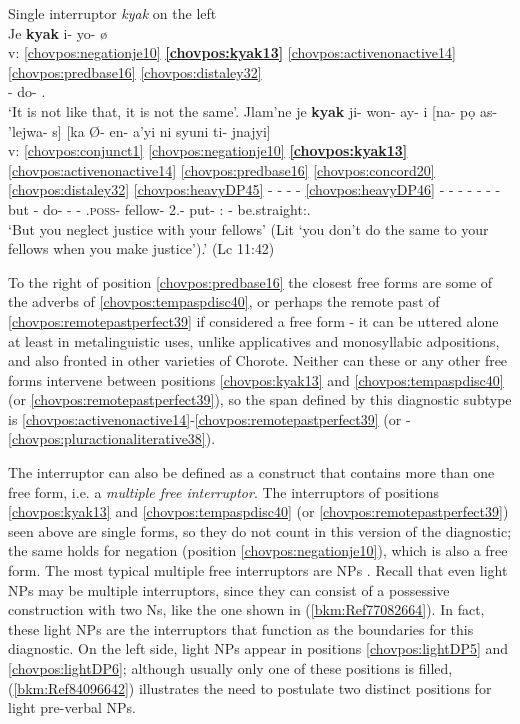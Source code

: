\documentclass[output=paper]{langscibook}
\begin{document}
\ea\label{ex:chor:key:3}Single interruptor \textit{kyak} on the left\\ 
    \ea
    \glll {} Je \textbf{kyak} i- yo- ø\\
    v: \ref{chovpos:negationje10} \textbf{\ref{chovpos:kyak13}} \ref{chovpos:activenonactive14} \ref{chovpos:predbase16} \ref{chovpos:distaley32} \\ 
    {} \Neg{} \Dem{} \Third{}- do- \Ap.\Dist{}\\
    \glt `It is not like that, it is not the same'.
    \ex 
    \glll {} Jlam'ne je \textbf{kyak} ji- won- ay- i [na- pọ as- 'lejwa- s] [ka Ø- en- a'yi ni syuni ti- jnajyi]\\ 
    v: \ref{chovpos:conjunct1} \ref{chovpos:negationje10} \textbf{\ref{chovpos:kyak13}} \ref{chovpos:activenonactive14} \ref{chovpos:predbase16} \ref{chovpos:concord20} \ref{chovpos:distaley32} \ref{chovpos:heavyDP45} - - - - \ref{chovpos:heavyDP46} - - - - - - - \\
     {} but \Neg{} \Dem{} \Second{}- do- \Second\Pl{}- \Ap{} \Dem{}{}- \Pl{} \Second\Pl{}.\textsc{poss}{}- fellow- \Pl{} \Comp{} 2.\Irr{}- put- \Second\Pl{}:\Ap{} \Dem{} \Dem{} \Third{}- be.straight:\Ap.\Loc{}\\
    \glt `But you neglect justice with your fellows' (Lit `you don't do the same to your fellows when you make justice').' (Lc 11:42)
    \z 
\z 

To the right of position \ref{chovpos:predbase16} the closest free forms are some of the adverbs of \ref{chovpos:tempaspdisc40}, or perhaps the remote past of \ref{chovpos:remotepastperfect39} if considered a free form - it can be uttered alone at least in metalinguistic uses, unlike applicatives and monosyllabic adpositions, and also fronted in other varieties of Chorote. Neither can these or any other free forms intervene between positions \ref{chovpos:kyak13} and \ref{chovpos:tempaspdisc40} (or \ref{chovpos:remotepastperfect39}), so the span defined by this diagnostic subtype is \ref{chovpos:activenonactive14}{}-\ref{chovpos:remotepastperfect39} (or -\ref{chovpos:pluractionaliterative38}).

The interruptor can also be defined as a construct that contains more than one free form, i.e. a \textit{multiple free interruptor}. The interruptors of positions \ref{chovpos:kyak13} and \ref{chovpos:tempaspdisc40} (or \ref{chovpos:remotepastperfect39}) seen above are single forms, so they do not count in this version of the diagnostic; the same holds for negation (position \ref{chovpos:negationje10}), which is also a free form. The most typical multiple free interruptors are NPs \citep{Tallman2021}. Recall that even light NPs may be multiple interruptors, since they can consist of a possessive construction with two Ns, like the one shown in (\ref{bkm:Ref77082664}). In fact, these light NPs are the interruptors that function as the boundaries for this diagnostic. On the left side, light NPs appear in positions \ref{chovpos:lightDP5} and \ref{chovpos:lightDP6}; although usually only one of these positions is filled, (\ref{bkm:Ref84096642}) illustrates the need to postulate two distinct positions for light pre-verbal NPs. 
\end{document}
